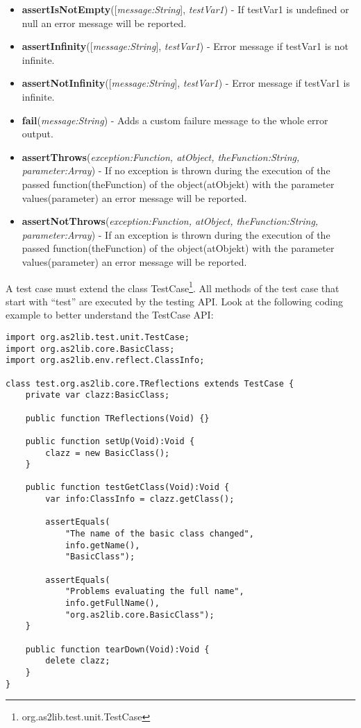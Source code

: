 \begin{itemize}
	\item \textbf{assertIsNotEmpty}([\textit{message:String}], \textit{testVar1}) - If testVar1 is undefined or null an error message will be reported.
	\item \textbf{assertInfinity}([\textit{message:String}], \textit{testVar1}) - Error message if testVar1 is not infinite.
	\item \textbf{assertNotInfinity}([\textit{message:String}], \textit{testVar1}) - Error message if testVar1 is infinite.
	\item \textbf{fail}(\textit{message:String}) - Adds a custom failure message to the whole error output.
	\item \textbf{assertThrows}(\textit{exception:Function, atObject, theFunction:String, parameter:Array}) - If no exception is thrown during the execution of the passed function(theFunction) of the object(atObjekt) with the parameter values(parameter) an error message will be reported.
	\item \textbf{assertNotThrows}(\textit{exception:Function, atObject, theFunction:String, parameter:Array}) - If an exception is thrown during the execution of the passed function(theFunction) of the object(atObjekt) with the parameter values(parameter) an error message will be reported.
\end{itemize}

A test case must extend the class TestCase\footnote{org.as2lib.test.unit.TestCase}. All methods of the test case that start with ``test'' are executed by the testing API. Look at the following coding example to better understand the TestCase API:
\begin{lstlisting}[frame=single]
import org.as2lib.test.unit.TestCase;
import org.as2lib.core.BasicClass;
import org.as2lib.env.reflect.ClassInfo;

class test.org.as2lib.core.TReflections extends TestCase {
	private var clazz:BasicClass;
	
	public function TReflections(Void) {}
	
	public function setUp(Void):Void {
		clazz = new BasicClass();
	}
	
	public function testGetClass(Void):Void {
		var info:ClassInfo = clazz.getClass();
		
		assertEquals(
			"The name of the basic class changed",
			info.getName(),
			"BasicClass");
		
		assertEquals(
			"Problems evaluating the full name",
			info.getFullName(),
			"org.as2lib.core.BasicClass");
	}
	
	public function tearDown(Void):Void {
		delete clazz;
	}
}
\end{lstlisting}


